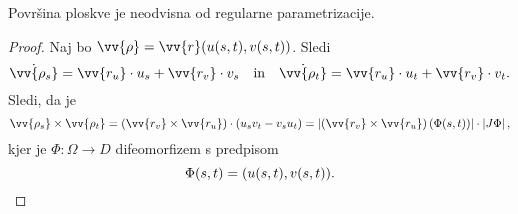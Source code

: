 \obvs

\begin{trditev}
Površina ploskve je neodvisna od regularne parametrizacije.
\end{trditev}

\begin{proof}
Naj bo $\vv{\rho} = \vv{r}(u(s,t), v(s,t))$. Sledi
\[
\dot{\vv{\rho_s}} = \vv{r_u} \cdot u_s + \vv{r_v} \cdot v_s
\quad \text{in} \quad
\dot{\vv{\rho_t}} = \vv{r_u} \cdot u_t + \vv{r_v} \cdot v_t.
\]
Sledi, da je
\[
\vv{\rho_s} \times \vv{\rho_t} =
\left(\vv{r_v} \times \vv{r_u} \right) \cdot (u_s v_t - v_s u_t) =
\abs{\left(\vv{r_v} \times \vv{r_u} \right)(\Phi(s,t))} \cdot
\abs{J\Phi},
\]
kjer je $\Phi \colon \Omega \to D$ difeomorfizem s predpisom
\[
\Phi(s,t) = (u(s,t), v(s,t)). \qedhere
\]
\end{proof}
